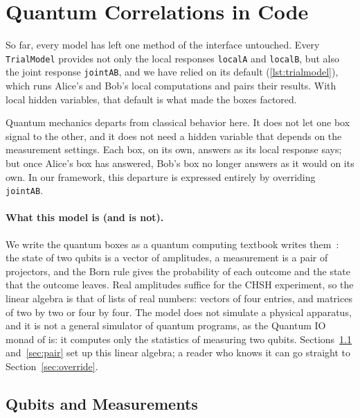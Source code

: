 \documentclass[11pt]{article}
\newcommand{\hs}{\lstinline[style=hask,basicstyle=\ttfamily,frame=none]}
\begin{document}
\section{Quantum Correlations in Code}\label{sec:quantum}

So far, every model has left one method of the interface untouched. Every \hs|TrialModel| provides not only the local responses \hs|localA| and \hs|localB|, but also the joint response \hs|jointAB|, and we have relied on its default (\ref{lst:trialmodel}), which runs Alice's and Bob's local computations and pairs their results. With local hidden variables, that default is what made the boxes factored.

Quantum mechanics departs from classical behavior here. It does not let one box signal to the other, and it does not need a hidden variable that depends on the measurement settings. Each box, on its own, answers as its local response says; but once Alice's box has answered, Bob's box no longer answers as it would on its own. In our framework, this departure is expressed entirely by overriding \hs|jointAB|.

\paragraph{What this model is (and is not).} We write the quantum boxes as a quantum computing textbook writes them~\citep{NielsenChuang2010}: the state of two qubits is a vector of amplitudes, a measurement is a pair of projectors, and the Born rule gives the probability of each outcome and the state that the outcome leaves. Real amplitudes suffice for the CHSH experiment, so the linear algebra is that of lists of real numbers: vectors of four entries, and matrices of two by two or four by four. The model does not simulate a physical apparatus, and it is not a general simulator of quantum programs, as the Quantum IO monad of \citet{AltenkirchGreen2010} is: it computes only the statistics of measuring two qubits. Sections~\ref{sec:qubits} and~\ref{sec:pair} set up this linear algebra; a reader who knows it can go straight to Section~\ref{sec:override}.

\subsection{Qubits and Measurements}\label{sec:qubits}
\end{document}
